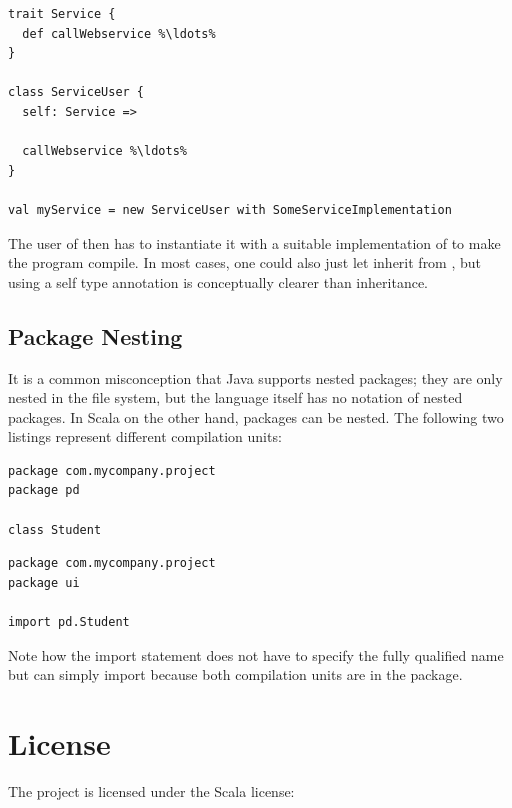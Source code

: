 \documentclass[10pt,a4paper,oneside]{scrreprt}
\begin{document}
\begin{lstlisting}
trait Service {
  def callWebservice %\ldots%
}

class ServiceUser {
  self: Service =>

  callWebservice %\ldots%
}

val myService = new ServiceUser with SomeServiceImplementation
\end{lstlisting}

The user of  then has to instantiate it with a suitable implementation of  to make the program compile. In most cases, one could also just let  inherit from , but using a self type annotation is conceptually clearer than inheritance.


\section{Package Nesting} \label{section:package-nesting}

It is a common misconception that Java supports nested packages; they are only nested in the file system, but the language itself has no notation of nested packages. In Scala on the other hand, packages can be nested. The following two listings represent different compilation units:

\begin{lstlisting}
package com.mycompany.project
package pd

class Student
\end{lstlisting}

\begin{lstlisting}
package com.mycompany.project
package ui

import pd.Student
\end{lstlisting}

Note how the import statement does not have to specify the fully qualified name but can simply import  because both compilation units are in the  package.

\label{end-chapter:advanced-scala-features}

\chapter{License} \label{chapter:scala-license}

The project is licensed under the Scala license:
\end{document}
